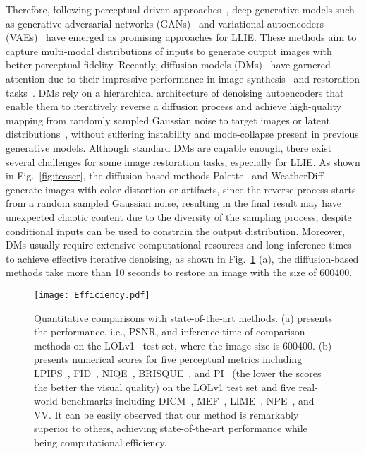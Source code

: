 Therefore, following perceptual-driven approaches~\cite{VGGLoss,perceptual_driven}, deep generative models such as generative adversarial networks (GANs)~\cite{EnlightenGAN,low_light_GAN} and variational autoencoders (VAEs)~\cite{LUD_VAE} have emerged as promising approaches for LLIE. These methods aim to capture multi-modal distributions of inputs to generate output images with better perceptual fidelity. Recently, diffusion models (DMs)~\cite{diffusion_1,diffusion_2,diffusion_3} have garnered attention due to their impressive performance in image synthesis~\cite{ddpm,ddim} and restoration tasks~\cite{Refusion,D2C-SR}. DMs rely on a hierarchical architecture of denoising autoencoders that enable them to iteratively reverse a diffusion process and achieve high-quality mapping from randomly sampled Gaussian noise to target images or latent distributions~\cite{latent_diffusion}, without suffering instability and mode-collapse present in previous generative models. Although standard DMs are capable enough, there exist several challenges for some image restoration tasks, especially for LLIE. As shown in Fig.~\ref{fig:teaser}, the diffusion-based methods Palette~\cite{palette} and WeatherDiff~\cite{weatherdiff} generate images with color distortion or artifacts, since the reverse process starts from a random sampled Gaussian noise, resulting in the final result may have unexpected chaotic content due to the diversity of the sampling process, despite conditional inputs can be used to constrain the output distribution. Moreover, DMs usually require extensive computational resources and long inference times to achieve effective iterative denoising, as shown in Fig.~\ref{fig:efficiency} (a), the diffusion-based methods take more than 10 seconds to restore an image with the size of 600400.
\begin{figure}[!t]
	\centering
	\texttt{[image: Efficiency.pdf]}
	\caption{Quantitative comparisons with state-of-the-art methods. (a) presents the performance, i.e., PSNR, and inference time of comparison methods on the LOLv1~\cite{RetinexNet} test set, where the image size is 600400. (b) presents numerical scores for five perceptual metrics including LPIPS~\cite{LPIPS}, FID~\cite{fid}, NIQE~\cite{NIQE}, BRISQUE~\cite{BRISQUE}, and PI~\cite{PI} (the lower the scores the better the visual quality) on the LOLv1 test set and five real-world benchmarks including DICM~\cite{DICM}, MEF~\cite{MEF}, LIME~\cite{LIME}, NPE~\cite{NPE}, and VV. It can be easily observed that our method is remarkably superior to others, achieving state-of-the-art performance while being computational efficiency.}
	\label{fig:efficiency}
\end{figure}

